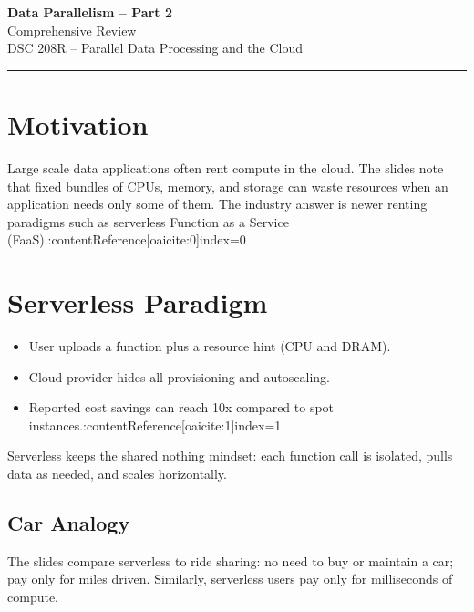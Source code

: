 \documentclass[11pt]{article}
\begin{document}
\begin{center}
  {\LARGE\bfseries Data Parallelism -- Part 2}\\[2mm]
  {\large Comprehensive Review}\\[1mm]
  {\normalsize DSC 208R -- Parallel Data Processing and the Cloud}
\end{center}
\vspace{-0.6em}\hrule\vspace{0.9em}

\tableofcontents
\newpage

\section{Motivation}

Large scale data applications often rent compute in the cloud.  The slides note that fixed bundles of CPUs, memory, and storage can waste resources when an application needs only some of them.  The industry answer is newer renting paradigms such as serverless Function as a Service (FaaS).:contentReference[oaicite:0]{index=0}

\section{Serverless Paradigm}

\begin{itemize}[itemsep=0pt]
  \item User uploads a function plus a resource hint (CPU and DRAM).
  \item Cloud provider hides all provisioning and autoscaling.
  \item Reported cost savings can reach 10x compared to spot instances.:contentReference[oaicite:1]{index=1}
\end{itemize}

Serverless keeps the shared nothing mindset: each function call is isolated, pulls data as needed, and scales horizontally.

\subsection*{Car Analogy}

The slides compare serverless to ride sharing: no need to buy or maintain a car; pay only for miles driven.  Similarly, serverless users pay only for milliseconds of compute.
\end{document}
